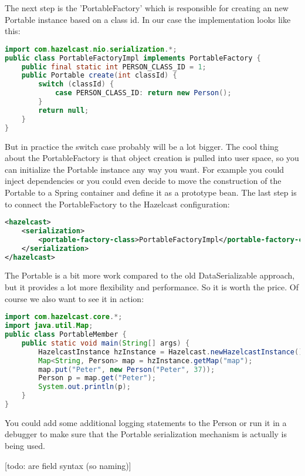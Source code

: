 The next step is the 'PortableFactory' which is responsible for creating an new Portable instance based on a class id. In our case the implementation looks like this:
\begin{lstlisting}[language=java]
import com.hazelcast.nio.serialization.*;
public class PortableFactoryImpl implements PortableFactory {
    public final static int PERSON_CLASS_ID = 1;
    public Portable create(int classId) {
        switch (classId) {
            case PERSON_CLASS_ID: return new Person();
        }
        return null;
    }
}
\end{lstlisting}
But in practice the switch case probably will be a lot bigger. The cool thing about the PortableFactory is that object creation is pulled into user space, so you can initialize the Portable instance any way you want. For example you could inject dependencies or you could even decide to move the construction of the Portable to a Spring container and define it as a prototype bean. The last step is to connect the PortableFactory to the Hazelcast configuration:
\begin{lstlisting}[language=xml]
<hazelcast>
    <serialization>
        <portable-factory-class>PortableFactoryImpl</portable-factory-class>
    </serialization>
</hazelcast>
\end{lstlisting}
The Portable is a bit more work compared to the old DataSerializable approach, but it provides a lot more flexibility and performance. So it is worth the price. Of course we also want to see it in action:
\begin{lstlisting}[language=java]
import com.hazelcast.core.*;
import java.util.Map;
public class PortableMember {
    public static void main(String[] args) {
        HazelcastInstance hzInstance = Hazelcast.newHazelcastInstance();
        Map<String, Person> map = hzInstance.getMap("map");
        map.put("Peter", new Person("Peter", 37));
        Person p = map.get("Peter");
        System.out.println(p);
    }
}
\end{lstlisting}
You could add some additional logging statements to the Person or run it in a debugger to make sure that the Portable serialization mechanism is actually is being used.

[todo: are field syntax (so naming)]


